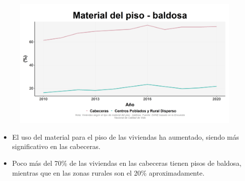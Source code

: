     \begin{figure}[H]
        \caption[Viviendas con piso de baldosa por zonas ]{\label{piso_baldosa_zonas} }
        \begin{center}
        \includegraphics[width=\textwidth,keepaspectratio]{img/var_174_trend.png}
        \end{center}
    \end{figure}
            \begin{itemize}
                    \item El uso del material para el piso de las viviendas ha aumentado, siendo más significativo en las cabeceras.
                    \item Poco más del 70\% de las viviendas en las cabeceras tienen pisos de baldosa, mientras que en las zonas rurales son el 20\% aproximadamente.
                    \end{itemize}

